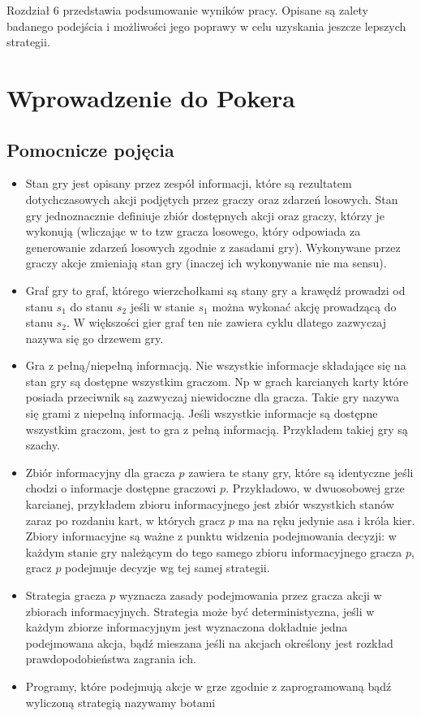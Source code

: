 \documentclass[licencjacka]{pracamgr}
\begin{document}
\noindent
Rozdział 6 przedstawia podsumowanie wyników pracy. Opisane są zalety badanego podejścia
i możliwości jego poprawy w celu uzyskania jeszcze lepszych strategii.

\chapter{Wprowadzenie do Pokera}

\section{Pomocnicze pojęcia}

\begin{itemize}
\item Stan gry jest opisany przez zespół informacji, które są rezultatem dotychczasowych akcji
      podjętych przez graczy oraz zdarzeń losowych. Stan gry jednoznacznie definiuje zbiór dostępnych
      akcji oraz graczy, którzy je wykonują (wliczając w to tzw gracza losowego, który odpowiada
      za generowanie zdarzeń losowych zgodnie z zasadami gry). Wykonywane przez graczy akcje
      zmieniają stan gry (inaczej ich wykonywanie nie ma sensu).
\item Graf gry to graf, którego wierzchołkami są stany gry a krawędź prowadzi od stanu
      $s_1$ do stanu $s_2$ jeśli w stanie $s_1$ można wykonać akcję prowadzącą do stanu
      $s_2$. W większości gier graf ten nie zawiera cyklu dlatego zazwyczaj nazywa się go
      drzewem gry.
\item Gra z pełną/niepełną informacją. Nie wszystkie informacje składające się na stan gry
      są dostępne wszystkim graczom. Np w grach karcianych karty które posiada przeciwnik
      są zazwyczaj niewidoczne dla gracza. Takie gry nazywa się grami z niepełną informacją.
      Jeśli wszystkie informacje są dostępne wszystkim graczom, jest to gra z pełną informacją.
      Przykładem takiej gry są szachy.
\item Zbiór informacyjny dla gracza $p$ zawiera te stany gry, które są identyczne jeśli chodzi
      o informacje dostępne graczowi $p$. Przykładowo, w dwuosobowej grze karcianej, przykładem zbioru informacyjnego
      jest zbiór wszystkich stanów zaraz po rozdaniu kart, w których gracz $p$ ma na ręku jedynie asa i króla kier.
      Zbiory informacyjne są ważne z punktu widzenia podejmowania decyzji: w każdym stanie gry należącym do tego
      samego zbioru informacyjnego gracza $p$, gracz $p$ podejmuje decyzje wg tej samej strategii.
\item Strategia gracza $p$ wyznacza zasady podejmowania przez gracza akcji w zbiorach informacyjnych.
      Strategia może być deterministyczna, jeśli w każdym zbiorze informacyjnym jest wyznaczona dokładnie
      jedna podejmowana akcja, bądź mieszana jeśli na akcjach określony jest rozkład prawdopodobieństwa
      zagrania ich.
\item Programy, które podejmują akcje w grze zgodnie z zaprogramowaną bądź wyliczoną strategią nazywamy botami
\end{itemize}
\end{document}
